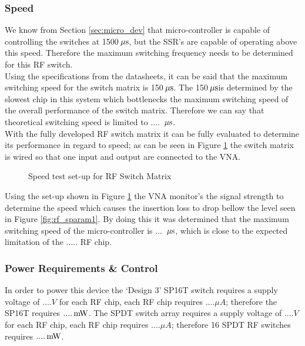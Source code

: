 \documentclass[12pt,openany,a4paper]{book}
\newcommand{\Pack}	{\hspace{-0.12em}}
\newcommand{\us}	{\ensuremath{\rm\,\mu s}}
\newcommand{\mW}	{\ensuremath{\rm\,m\Pack W}}
\begin{document}
\subsubsection{Speed}
We know from Section \ref{sec:micro_dev} that micro-controller is capable of controlling the switches at 1500\us , but the SSR's are capable of operating above this speed. Therefore the maximum switching frequency needs to be determined for this RF switch. \\
Using the specifications from the datasheets, it can be said that the maximum switching speed for the switch matrix is 150\us. The 150\us is determined by the slowest chip in this system which bottlenecks the maximum switching speed of the overall performance of the switch matrix. Therefore we can say that theoretical switching speed is limited to .... \us . \\[0.3cm]
With the fully developed RF switch matrix it can be fully evaluated to determine its performance in regard to speed; as can be seen in Figure \ref{fig:speedtest} the switch matrix is wired so that one input and output are connected to the VNA.
\begin{figure}[H]
	\centering
	\caption{Speed test set-up for RF Switch Matrix}
	\label{fig:speedtest}
\end{figure} 
Using the set-up shown in Figure \ref{fig:speedtest} the VNA monitor's the signal strength to determine the speed which causes the insertion loss to drop bellow the level seen in Figure \ref{fig:rf_sparam1}. By doing this it was determined that the maximum switching speed of the micro-controller is ... \us , which is close to the expected limitation of the ..... RF chip.


\subsubsection{Power Requirements \& Control}
In order to power this device the `Design 3' SP16T switch requires a supply voltage of $....V$ for each RF chip, each RF chip requires $....\mu A$; therefore the SP16T requires $....\mW$. The SPDT switch array requires a supply voltage of $....V$ for each RF chip, each RF chip requires $....\mu A$; therefore 16 SPDT RF switches requires $....\mW$.\\[0.2cm]
\end{document}
